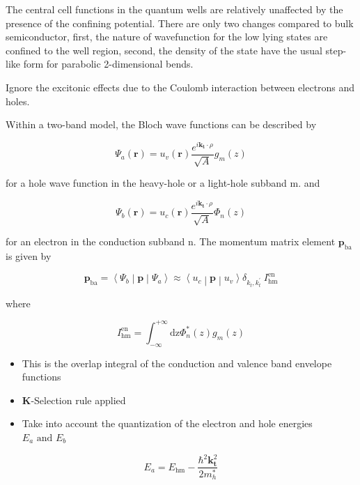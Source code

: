 The central cell functions in the quantum wells are relatively
unaffected by the presence of the confining potential. There are only
two changes compared to bulk semiconductor, first, the nature of
wavefunction for the low lying states are confined to the well region,
second, the density of the state have the usual step-like form for
parabolic 2-dimensional bends.

Ignore the excitonic effects due to the Coulomb interaction between
electrons and holes.

Within a two-band model, the Bloch wave functions can be described by

\begin{equation}
\Psi_{a}\left( \bm{r} \right) = u_{v}(\bm{r})\frac{e^{i\bm{k}_{\bm{t}} \cdot \rho}}{\sqrt{A}}g_{m}(z)
\end{equation}

for a hole wave function in the heavy-hole or a light-hole subband m.
and

\begin{equation}
\Psi_{b}\left( \bm{r} \right) = u_{c}(\bm{r})\frac{e^{i\bm{k}_{\bm{t}} \cdot \rho}}{\sqrt{A}}\Phi_{n}(z)
\end{equation}

for an electron in the conduction subband n. The momentum matrix element
\(\bm{p}_{\text{ba}}\) is given by

\begin{equation}
\bm{p}_{\text{ba}}\bm{=}\left\langle \Psi_{b} \middle| \bm{p} \middle| \Psi_{a} \right\rangle \approx \left\langle u_{c} \middle| \bm{p} \middle| u_{v} \right\rangle\delta_{k_{t},k_{t}^{'}}\ I_{\text{hm}}^{\text{en}}
\end{equation}

where

\begin{equation}
I_{\text{hm}}^{\text{en}} = \int_{- \infty}^{+ \infty}{\text{dz}\Phi_{n}^{*}(z)}g_{m}(z)
\end{equation}

\begin{itemize}
\item
  This is the overlap integral of the conduction and valence band
  envelope functions
\item
  \textbf{K}-Selection rule applied
\item
  Take into account the quantization of the electron and hole energies
  \(E_{a}\text{\ and\ }E_{b}\)
\end{itemize}

\begin{equation}
E_{a} = E_{\text{hm}} - \frac{\hbar^{2}\bm{k}_{\bm{t}}^{2}}{2m_{h}^{*}}
\end{equation}

